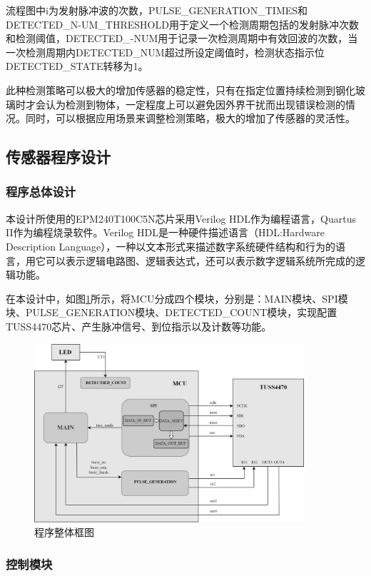 流程图中i为发射脉冲波的次数，PULSE\_GENERATION\_TIMES和DETECTED\_N-UM\_THRESHOLD用于定义一个检测周期包括的发射脉冲次数和检测阈值，DETECTED\_-NUM用于记录一次检测周期中有效回波的次数，当一次检测周期内DETECTED\_NUM超过所设定阈值时，检测状态指示位DETECTED\_STATE转移为1。\par
此种检测策略可以极大的增加传感器的稳定性，只有在指定位置持续检测到钢化玻璃时才会认为检测到物体，一定程度上可以避免因外界干扰而出现错误检测的情况。同时，可以根据应用场景来调整检测策略，极大的增加了传感器的灵活性。


\subsection{传感器程序设计}
\subsubsection{程序总体设计}
本设计所使用的EPM240T100C5N芯片采用Verilog HDL作为编程语言，Quartus II作为编程烧录软件。Verilog HDL是一种硬件描述语言（HDL:Hardware Description Language），一种以文本形式来描述数字系统硬件结构和行为的语言，用它可以表示逻辑电路图、逻辑表达式，还可以表示数字逻辑系统所完成的逻辑功能。\par
在本设计中，如图\ref{程序整体框图}所示，将MCU分成四个模块，分别是：MAIN模块、SPI模块、PULSE\_GENERATION模块、DETECTED\_COUNT模块，实现配置TUSS4470芯片、产生脉冲信号、到位指示以及计数等功能。
\begin{figure}[!h]
	\centering
	\includegraphics[width=10cm]{figure/Overall program block diagram.png}
	\caption{程序整体框图}
	\label{程序整体框图}
\end{figure}
\newpage
\subsubsection{控制模块}

